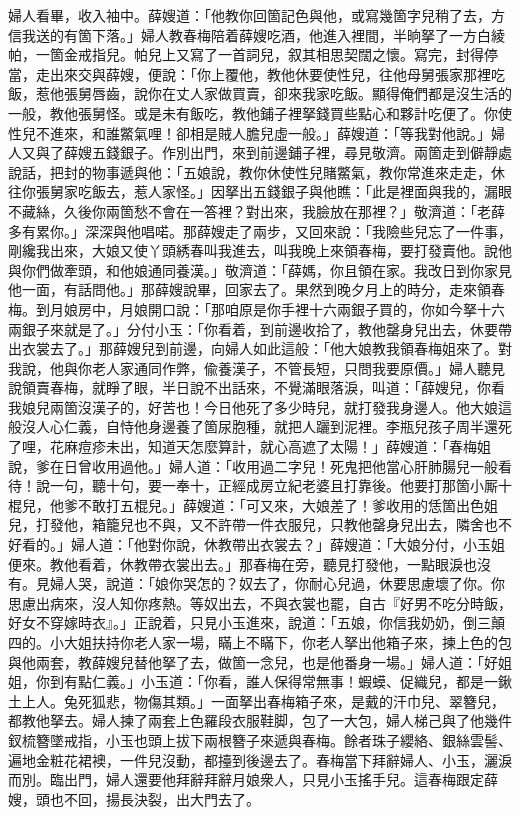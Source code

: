 婦人看畢，收入袖中。薛嫂道：「他教你回箇記色與他，或寫幾箇字兒稍了去，方信我送的有箇下落。」婦人教春梅陪着薛嫂吃酒，他進入裡間，半晌拏了一方白綾帕，一箇金戒指兒。帕兒上又寫了一首詞兒，叙其相思契闊之懷。寫完，封得停當，走出來交與薛嫂，便說：「你上覆他，教他休要使性兒，往他母舅張家那裡吃飯，惹他張舅唇齒，說你在丈人家做買賣，卻來我家吃飯。顯得俺們都是沒生活的一般，教他張舅怪。或是未有飯吃，教他鋪子裡拏錢買些點心和夥計吃便了。你使性兒不進來，和誰鱉氣哩！卻相是賊人膽兒虛一般。」薛嫂道：「等我對他說。」婦人又與了薛嫂五錢銀子。作別出門，來到前邊鋪子裡，尋見敬濟。兩箇走到僻靜處說話，把封的物事遞與他：「五娘說，教你休使性兒賭鱉氣，教你常進來走走，休往你張舅家吃飯去，惹人家怪。」因拏出五錢銀子與他瞧：「此是裡面與我的，漏眼不藏絲，久後你兩箇愁不會在一答裡？對出來，我臉放在那裡？」敬濟道：「老薛多有累你。」深深與他唱喏。那薛嫂走了兩步，又回來說：「我險些兒忘了一件事，剛纔我出來，大娘又使丫頭綉春叫我進去，叫我晚上來領春梅，要打發賣他。說他與你們做牽頭，和他娘通同養漢。」敬濟道：「薛媽，你且領在家。我改日到你家見他一面，有話問他。」那薛嫂說畢，回家去了。果然到晚夕月上的時分，走來領春梅。到月娘房中，月娘開口說：「那咱原是你手裡十六兩銀子買的，你如今拏十六兩銀子來就是了。」分付小玉：「你看着，到前邊收拾了，教他罄身兒出去，休要帶出衣裳去了。」那薛嫂兒到前邊，向婦人如此這般：「他大娘教我領春梅姐來了。對我說，他與你老人家通同作弊，偸養漢子，不管長短，只問我要原價。」婦人聽見說領賣春梅，就睜了眼，半日說不出話來，不覺滿眼落淚，叫道：「薛嫂兒，你看我娘兒兩箇沒漢子的，好苦也！{}今日他死了多少時兒，就打發我身邊人。他大娘這般沒人心仁義，自恃他身邊養了箇尿胞種，就把人躧到泥裡。李瓶兒孩子周半還死了哩，花麻痘疹未出，知道天怎麼算計，就心高遮了太陽！」薛嫂道：「春梅姐說，爹在日曾收用過他。」婦人道：「收用過二字兒！死鬼把他當心肝肺腸兒一般看待！說一句，聽十句，要一奉十，正經成房立紀老婆且打靠後。他要打那箇小厮十棍兒，他爹不敢打五棍兒。」薛嫂道：「可又來，大娘差了！爹收用的恁箇出色姐兒，打發他，箱籠兒也不與，又不許帶一件衣服兒，只教他罄身兒出去，隣舍也不好看的。」{}婦人道：「他對你說，休教帶出衣裳去？」薛嫂道：「大娘分付，小玉姐便來。教他看着，休教帶衣裳出去。」那春梅在旁，聽見打發他，一點眼淚也沒有。見婦人哭，說道：「娘你哭怎的？奴去了，你耐心兒過，休要思慮壞了你。你思慮出病來，沒人知你疼熱。等奴出去，不與衣裳也罷，自古『好男不吃分時飯，好女不穿嫁時衣』。」{}正說着，只見小玉進來，說道：「五娘，你信我奶奶，倒三顛四的。小大姐扶持你老人家一場，瞞上不瞞下，你老人拏出他箱子來，揀上色的包與他兩套，教薛嫂兒替他拏了去，做箇一念兒，也是他番身一場。」婦人道：「好姐姐，你到有點仁義。」小玉道：「你看，誰人保得常無事！蝦蟆、促織兒，都是一鍬土上人。兔死狐悲，物傷其類。」一面拏出春梅箱子來，是戴的汗巾兒、翠簪兒，都教他拏去。婦人揀了兩套上色羅段衣服鞋脚，包了一大包，婦人梯己與了他幾件釵梳簪墜戒指，小玉也頭上拔下兩根簪子來遞與春梅。餘者珠子纓絡、銀絲雲髻、遍地金粧花裙襖，一件兒沒動，都擡到後邊去了。春梅當下拜辭婦人、小玉，灑淚而別。臨出門，婦人還要他拜辭拜辭月娘衆人，{}只見小玉搖手兒。這春梅跟定薛嫂，頭也不回，揚長決裂，出大門去了。{}

